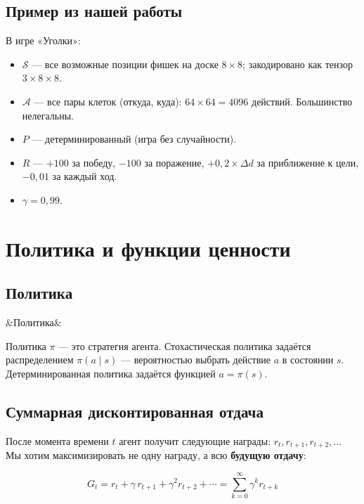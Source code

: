 \documentclass[a4paper, 11pt]{article}
\newenvironment{defbox}[1][]{%
  \begin{mdframed}[style=defstyle]
  \ifx&#1&\else{\bfseries\color{defblue}#1.}\quad\fi\ignorespaces
}{%
  \end{mdframed}
}
\begin{document}
\subsection{Пример из нашей работы}

В игре «Уголки»:
\begin{itemize}[itemsep=2pt]
  \item $\mathcal{S}$ — все возможные позиции фишек на доске $8 \times 8$;
        закодировано как тензор $3 \times 8 \times 8$.
  \item $\mathcal{A}$ — все пары клеток (откуда, куда): $64 \times 64 = 4096$
        действий. Большинство нелегальны.
  \item $P$ — детерминированный (игра без случайности).
  \item $R$ — $+100$ за победу, $-100$ за поражение, $+0{,}2 \times \Delta d$
        за приближение к цели, $-0{,}01$ за каждый ход.
  \item $\gamma = 0{,}99$.
\end{itemize}

\section{Политика и функции ценности}

\subsection{Политика}

\begin{defbox}[Политика]
Политика $\pi$ — это стратегия агента. Стохастическая политика задаётся
распределением $\pi(a \mid s)$ — вероятностью выбрать действие $a$ в
состоянии $s$. Детерминированная политика задаётся функцией $a = \pi(s)$.
\end{defbox}

\subsection{Суммарная дисконтированная отдача}

После момента времени $t$ агент получит следующие награды: $r_t, r_{t+1},
r_{t+2}, \ldots$ Мы хотим максимизировать не одну награду, а всю
\textbf{будущую отдачу}:

\begin{equation}
  G_t = r_t + \gamma\, r_{t+1} + \gamma^2 r_{t+2} + \cdots
       = \sum_{k=0}^{\infty} \gamma^k r_{t+k}
  \label{eq:return}
\end{equation}
\end{document}
